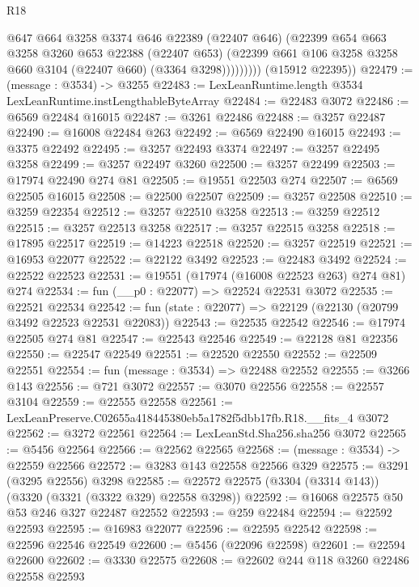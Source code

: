 \begin{lexlean}{R18}
\begin{coremodule}
                  @647
                  @664
                  @3258
                  @3374
                  @646
                  @22389
                  (@22407 @646)
                  (@22399
                    @654
                    @663
                    @3258
                    @3260
                    @653
                    @22388
                    (@22407 @653)
                    (@22399 @661 @106 @3258 @3258 @660 @3104 (@22407 @660) (@3364 @3298)))))))))
      (@15912 @22395))
@22479 := (message : @3534) -> @3255
@22483 := LexLeanRuntime.length @3534 LexLeanRuntime.instLengthableByteArray
@22484 := @22483 @3072
@22486 := @6569 @22484 @16015
@22487 := @3261 @22486
@22488 := @3257 @22487
@22490 := @16008 @22484 @263
@22492 := @6569 @22490 @16015
@22493 := @3375 @22492
@22495 := @3257 @22493 @3374
@22497 := @3257 @22495 @3258
@22499 := @3257 @22497 @3260
@22500 := @3257 @22499
@22503 := @17974 @22490 @274 @81
@22505 := @19551 @22503 @274
@22507 := @6569 @22505 @16015
@22508 := @22500 @22507
@22509 := @3257 @22508
@22510 := @3259 @22354
@22512 := @3257 @22510 @3258
@22513 := @3259 @22512
@22515 := @3257 @22513 @3258
@22517 := @3257 @22515 @3258
@22518 := @17895 @22517
@22519 := @14223 @22518
@22520 := @3257 @22519
@22521 := @16953 @22077
@22522 := @22122 @3492
@22523 := @22483 @3492
@22524 := @22522 @22523
@22531 := @19551 (@17974 (@16008 @22523 @263) @274 @81) @274
@22534 := fun (__p0 : @22077) => @22524 @22531 @3072
@22535 := @22521 @22534
@22542 := fun (state : @22077) => @22129 (@22130 (@20799 @3492 @22523 @22531 @22083))
@22543 := @22535 @22542
@22546 := @17974 @22505 @274 @81
@22547 := @22543 @22546
@22549 := @22128 @81 @22356
@22550 := @22547 @22549
@22551 := @22520 @22550
@22552 := @22509 @22551
@22554 := fun (message : @3534) => @22488 @22552
@22555 := @3266 @143
@22556 := @721 @3072
@22557 := @3070 @22556
@22558 := @22557 @3104
@22559 := @22555 @22558
@22561 := LexLeanPreserve.C02655a418445380eb5a1782f5dbb17fb.R18.__fits_4 @3072
@22562 := @3272 @22561
@22564 := LexLeanStd.Sha256.sha256 @3072
@22565 := @5456 @22564
@22566 := @22562 @22565
@22568 := (message : @3534) -> @22559 @22566
@22572 := @3283 @143 @22558 @22566 @329
@22575 := @3291 (@3295 @22556) @3298
@22585 := @22572 @22575 (@3304 (@3314 @143)) (@3320 (@3321 (@3322 @329) @22558 @3298))
@22592 := @16068 @22575 @50 @53 @246 @327 @22487 @22552
@22593 := @259 @22484
@22594 := @22592 @22593
@22595 := @16983 @22077
@22596 := @22595 @22542
@22598 := @22596 @22546 @22549
@22600 := @5456 (@22096 @22598)
@22601 := @22594 @22600
@22602 := @3330 @22575
@22608 := @22602 @244 @118 @3260 @22486 @22558 @22593

\end{coremodule}
\end{lexlean}
